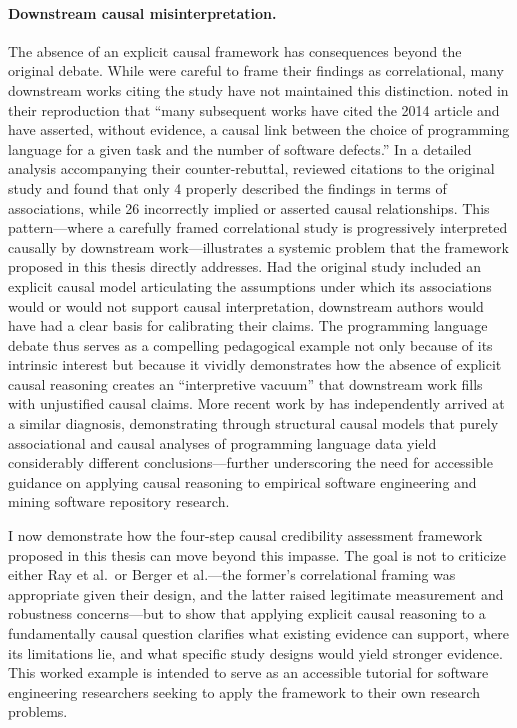 \paragraph{Downstream causal misinterpretation.}
The absence of an explicit causal framework has consequences beyond the original debate.
While \citet{DBLP:conf/sigsoft/RayPFD14} were careful to frame their findings as correlational, many downstream works citing the study have not maintained this distinction.
\citet{DBLP:journals/toplas/BergerHMVV19} noted in their reproduction that ``many subsequent works have cited the 2014 article and have asserted, without evidence, a causal link between the choice of programming language for a given task and the number of software defects.''
In a detailed analysis accompanying their counter-rebuttal, \citet{DBLP:journals/corr/abs-1911-11894} reviewed citations to the original study and found that only 4 properly described the findings in terms of associations, while 26 incorrectly implied or asserted causal relationships.
This pattern---where a carefully framed correlational study is progressively interpreted causally by downstream work---illustrates a systemic problem that the framework proposed in this thesis directly addresses.
Had the original study included an explicit causal model articulating the assumptions under which its associations would or would not support causal interpretation, downstream authors would have had a clear basis for calibrating their claims.
The programming language debate thus serves as a compelling pedagogical example not only because of its intrinsic interest but because it vividly demonstrates how the absence of explicit causal reasoning creates an ``interpretive vacuum'' that downstream work fills with unjustified causal claims.
More recent work by \citet{DBLP:journals/tosem/FuriaTF24} has independently arrived at a similar diagnosis, demonstrating through structural causal models that purely associational and causal analyses of programming language data yield considerably different conclusions---further underscoring the need for accessible guidance on applying causal reasoning to empirical software engineering and mining software repository research.

I now demonstrate how the four-step causal credibility assessment framework proposed in this thesis can move beyond this impasse.
The goal is not to criticize either Ray et al.\ or Berger et al.---the former's correlational framing was appropriate given their design, and the latter raised legitimate measurement and robustness concerns---but to show that applying explicit causal reasoning to a fundamentally causal question clarifies what existing evidence can support, where its limitations lie, and what specific study designs would yield stronger evidence.
This worked example is intended to serve as an accessible tutorial for software engineering researchers seeking to apply the framework to their own research problems.

